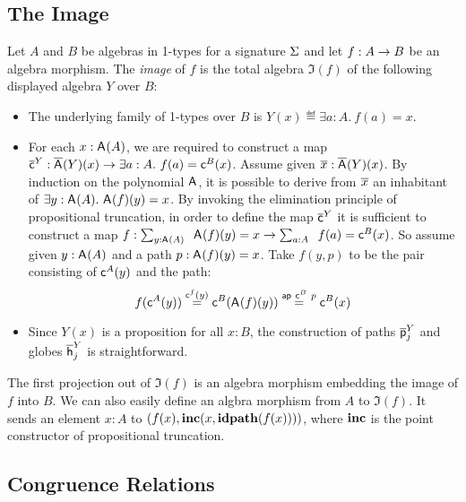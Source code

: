 \cite{lynge2019}


\subsection{The Image}

\begin{definition}
Let $A$ and $B$ be algebras in 1-types for a signature $\Sigma$ and let
$f : A \rightarrow B$ be an algebra morphism. The \emph{image} of $f$ is
the total algebra $\Im(f)$ of the following displayed algebra $Y$ over $B$:
\begin{itemize}
\item The underlying family of 1-types over $B$ is $Y(x) \eqdef \exists a : A.\ f(a) = x$.
\item For each $x : \mathsf{A}^{}(A)$, we are required to construct
a map $\overline{\mathsf{c}}^{Y} : \overline{\mathsf{A}^{}}(Y)(x) \rightarrow
\exists a : A.\ f(a) = \mathsf{c}^{B}(x)$. Assume given $\overline{x}
: \overline{\mathsf{A}^{}}(Y)(x)$. By induction on the polynomial
$\mathsf{A}^{}$, it is possible to derive from $\overline{x}$ an
inhabitant of $\exists y
: \mathsf{A}^{}(A).\ \mathsf{A}^{}(f)(y) = x$. By
invoking the elimination principle of propositional truncation, in
order to define the map $\overline{\mathsf{c}}^{Y}$ it is sufficient to
construct a map $f : \Sum {y
: \polyAct{\pointconstr}{A}}.\ \polyAct{\pointconstr}{f}(y) =
x \rightarrow \Sum {a : A}.\ f(a) = \AlgPoint{B}(x)$.  So assume given
$y : \mathsf{A}^{}(A)$ and a path $p
: \mathsf{A}^{}(f)(y) = x$. Take $f(y,p)$ to be the pair
consisting of $\mathsf{c}^{A}(y)$ and the path:
\[
f(\mathsf{c}^{A}(y))
\stackrel{\mathsf{c}^{f}(y)}{=}
\mathsf{c}^{B}(\mathsf{A}^{}(f)(y))
\stackrel{\mathsf{ap} \ \mathsf{c}^{B} \ p}{=}
\mathsf{c}^{B}(x)
\]
\item Since $Y(x)$ is a proposition for all $x : B$, the construction of
paths $\overline{\mathsf{p}}^{Y}_{j}$ and globes $\overline{\mathsf{h}}^{Y}_{j}$ is
straightforward.
\end{itemize}

The first projection out of $\Im(f)$ is an algebra morphism embedding
the image of $f$ into $B$. We can also easily define an algbra
morphism from $A$ to $\Im(f)$. It sends an element $x : A$ to
$(f(x),\operatorname{\mathbf{inc}}(x,\operatorname{\mathbf{idpath}}(f(x))))$, where $\operatorname{\mathbf{inc}}$ is the point constructor of
propositional truncation. 
\end{definition}



\subsection{Congruence Relations}

